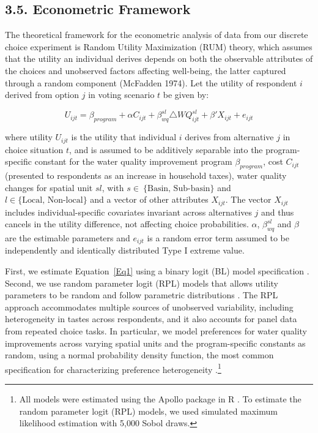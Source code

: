 \documentclass[12pt]{article}
\begin{document}
\subsection*{3.5. Econometric Framework}

The theoretical framework for the econometric analysis of data from our discrete choice experiment is Random Utility Maximization (RUM) 
theory, which assumes that the utility an individual derives depends on both the observable attributes of the choices and unobserved 
factors affecting well-being, the latter captured through a random component (McFadden 1974). Let the utility of respondent $i$ derived 
from option $j$ in voting scenario $t$ be given by:

\begin{equation}
U_{ijt} = \beta_{program} + \alpha C_{ijt} + \beta^{sl}_{wq} \triangle WQ^{sl}_{ijt} + \beta' X_{ijt} + e_{ijt}
\label{Eq1}
\end{equation}

\noindent where utility $U_{ijt}$ is the utility that individual $i$ derives from alternative $j$ in choice situation $t$, and is assumed 
to be additively separable into the program-specific constant for the water quality improvement program $\beta_{program}$, cost $C_{ijt}$ 
(presented to respondents as an increase in household taxes), water quality changes for spatial unit $ sl $, 
with $ s \in\ \{ \text{Basin, Sub-basin} \} $ and $ l \in \{ \text{Local, Non-local} \} $ and a vector of other 
attributes $X_{ijt}$. The vector $X_{ijt}$ includes individual-specific covariates invariant across alternatives $j$ and thus cancels 
in the utility difference, not affecting choice probabilities. $\alpha$, $\beta^{sl}_{wq}$ and $\beta$ are the estimable parameters 
and $e_{ijt}$ is a random error term assumed to be independently and identically distributed Type I extreme value.

First, we estimate Equation~\ref{Eq1} using a binary logit (BL) model specification \parencite{train2009discrete}. Second, we use 
random parameter logit (RPL) models that allows utility parameters to be random and follow parametric distributions \parencite{revelt1998mixed}. 
The RPL approach accommodates multiple sources of unobserved variability, including heterogeneity in tastes across respondents, and it also 
accounts for panel data from repeated choice tasks. In particular, we model preferences for water quality improvements across varying spatial 
units and the program-specific constants as random, using a normal probability density function, the most common specification for 
characterizing preference heterogeneity \parencite{train2009discrete}.\footnote{All models were estimated using the Apollo package in 
R \parencite{hess2019apollo}. To estimate the random parameter logit (RPL) models, we used simulated maximum likelihood estimation with 5,000 Sobol draws.}
\end{document}

